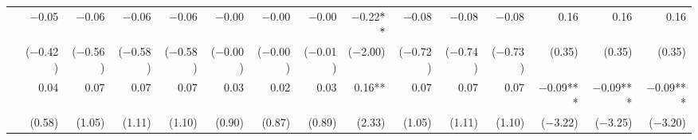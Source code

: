 \begin{tabularx}{1.45\textwidth}{lRRRRRRRRRRRRRR}
		 & \num{-0.05}\phantom{***)} & \num{-0.06}\phantom{***)} & \num{-0.06}\phantom{***)} & \num{-0.06}\phantom{***)} & \num{-0.00}\phantom{***)} & \num{-0.00}\phantom{***)} & \num{-0.00}\phantom{***)} & \num{-0.22}**\phantom{*)} & \num{-0.08}\phantom{***)} & \num{-0.08}\phantom{***)} & \num{-0.08}\phantom{***)} & \num{0.16}\phantom{***)} & \num{0.16}\phantom{***)} & \num{0.16}\phantom{***)} \\
		 & (\num{-0.42})\phantom{***} & (\num{-0.56})\phantom{***} & (\num{-0.58})\phantom{***} & (\num{-0.58})\phantom{***} & (\num{-0.00})\phantom{***} & (\num{-0.00})\phantom{***} & (\num{-0.01})\phantom{***} & (\num{-2.00})\phantom{***} & (\num{-0.72})\phantom{***} & (\num{-0.74})\phantom{***} & (\num{-0.73})\phantom{***} & (\num{0.35})\phantom{***} & (\num{0.35})\phantom{***} & (\num{0.35})\phantom{***} \\ [\dspacing]
		 & \num{0.04}\phantom{***)} & \num{0.07}\phantom{***)} & \num{0.07}\phantom{***)} & \num{0.07}\phantom{***)} & \num{0.03}\phantom{***)} & \num{0.02}\phantom{***)} & \num{0.03}\phantom{***)} & \num{0.16}**\phantom{*)} & \num{0.07}\phantom{***)} & \num{0.07}\phantom{***)} & \num{0.07}\phantom{***)} & \num{-0.09}***\phantom{)} & \num{-0.09}***\phantom{)} & \num{-0.09}***\phantom{)} \\
		 & (\num{0.58})\phantom{***} & (\num{1.05})\phantom{***} & (\num{1.11})\phantom{***} & (\num{1.10})\phantom{***} & (\num{0.90})\phantom{***} & (\num{0.87})\phantom{***} & (\num{0.89})\phantom{***} & (\num{2.33})\phantom{***} & (\num{1.05})\phantom{***} & (\num{1.11})\phantom{***} & (\num{1.10})\phantom{***} & (\num{-3.22})\phantom{***} & (\num{-3.25})\phantom{***} & (\num{-3.20})\phantom{***} \\ [\dspacing]
        \bottomrule
    \end{tabularx}%